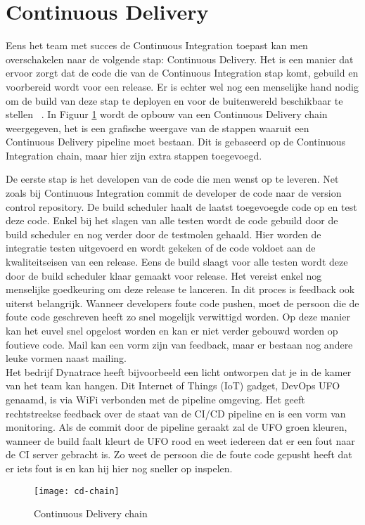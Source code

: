         \section{Continuous Delivery}
        Eens het team met succes de Continuous Integration toepast kan men overschakelen naar de volgende stap: Continuous Delivery.
        Het is een manier dat ervoor zorgt dat de code die van de Continuous Integration stap komt, gebuild en voorbereid wordt voor een release.
        Er is echter wel nog een menselijke hand nodig om de build van deze stap te deployen en voor de buitenwereld beschikbaar te stellen ~\autocite{Fowler2013}.
        \newline{}In Figuur \ref{img-cd-chain} wordt de opbouw van een Continuous Delivery chain weergegeven, het is een grafische weergave van de stappen waaruit een Continuous Delivery pipeline moet bestaan. Dit is gebaseerd op de Continuous Integration chain, maar hier zijn extra stappen toegevoegd.
        
        De eerste stap is het developen van de code die men wenst op te leveren. Net zoals bij Continuous Integration commit de developer de code naar de version control repository. De build scheduler haalt de laatst toegevoegde code op en test deze code. Enkel bij het slagen van alle testen wordt de code gebuild door de build scheduler en nog verder door de testmolen gehaald. Hier worden de integratie testen uitgevoerd en wordt gekeken of de code voldoet aan de kwaliteitseisen van een release. Eens de build slaagt voor alle testen wordt deze door de build scheduler klaar gemaakt voor release. Het vereist enkel nog menselijke goedkeuring om deze release te lanceren.
        \newline{}In dit proces is feedback ook uiterst belangrijk. Wanneer developers foute code pushen, moet de persoon die de foute code geschreven heeft zo snel mogelijk verwittigd worden. Op deze manier kan het euvel snel opgelost worden en kan er niet verder gebouwd worden op foutieve code.
        Mail kan een vorm zijn van feedback, maar er bestaan nog andere leuke vormen naast mailing.\\
        Het bedrijf Dynatrace heeft bijvoorbeeld een licht ontworpen dat je in de kamer van het team kan hangen. Dit Internet of Things (IoT) gadget, DevOps UFO genaamd, is via WiFi verbonden met de pipeline omgeving. Het geeft rechtstreekse feedback over de staat van de CI/CD pipeline en is een vorm van monitoring. Als de commit door de pipeline geraakt zal de UFO groen kleuren, wanneer de build faalt kleurt de UFO rood en weet iedereen dat er een fout naar de CI server gebracht is. Zo weet de persoon die de foute code gepusht heeft dat er iets fout is en kan hij hier nog sneller op inspelen. 
        \begin{figure}	
            \texttt{[image: cd-chain]}
            \caption{Continuous Delivery chain ~\autocite{Riti2018}} \label{img-cd-chain}
        \end{figure}
        
